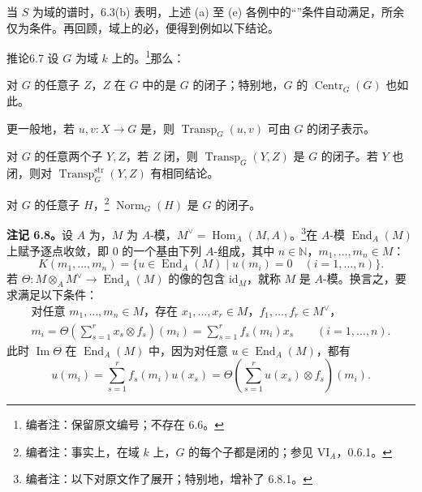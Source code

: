 当 $S$ 为域的谱时，6.3(b) 表明，上述 (a) 至 (e) 各例中的“”条件自动满足，所余仅为条件。再回顾，域上的必，便得到例如以下结论。
\begin{SGAresult}{推论}{6.7}
设 $G$ 为域 $k$ 上的。\footnote[29]{编者注：保留原文编号；不存在 6.6。}那么：

对 $G$ 的任意子 $Z$，$Z$ 在 $G$ 中的是 $G$ 的闭子；特别地，$G$ 的 $\operatorname{Centr}_G(G)$ 也如此。

更一般地，若 $u,v:X\to G$ 是，则 $\operatorname{Transp}_G(u,v)$ 可由 $G$ 的闭子表示。

对 $G$ 的任意两个子 $Y,Z$，若 $Z$ 闭，则 $\operatorname{Transp}_G(Y,Z)$ 是 $G$ 的闭子。若 $Y$ 也闭，则对 $\operatorname{Transp}^{\mathrm{str}}_G(Y,Z)$ 有相同结论。

对 $G$ 的任意子 $H$，\footnote[30]{编者注：事实上，在域 $k$ 上，$G$ 的每个子都是闭的；参见 VI$_A$，0.6.1。} $\operatorname{Norm}_G(H)$ 是 $G$ 的闭子。
\end{SGAresult}
\textbf{注记 6.8。}设 $A$ 为，$M$ 为 $A$-模，$M^\vee=\operatorname{Hom}_A(M,A)$。\footnote[31]{编者注：以下对原文作了展开；特别地，增补了 6.8.1。}在 $A$-模 $\operatorname{End}_A(M)$ 上赋予逐点收敛，即 $0$ 的一个基由下列 $A$-组成，其中 $n\in\mathbb N$，$m_1,\ldots,m_n\in M$：
\[
K(m_1,\ldots,m_n)=\{u\in\operatorname{End}_A(M)\mid u(m_i)=0\quad(i=1,\ldots,n)\}.
\]
若 $\Theta:M\otimes_AM^\vee\to\operatorname{End}_A(M)$ 的像的包含 $\mathrm{id}_M$，就称 $M$ 是 $A$-模。换言之，要求满足以下条件：
\[
\begin{gathered}
\text{对任意 }m_1,\ldots,m_n\in M，\text{存在 }x_1,\ldots,x_r\in M，f_1,\ldots,f_r\in M^\vee，\\
 m_i=\Theta\!\left(\sum_{s=1}^r x_s\otimes f_s\right)(m_i)
 =\sum_{s=1}^r f_s(m_i)x_s\qquad(i=1,\ldots,n).
\end{gathered}\tag{*}
\]
此时 $\operatorname{Im}\Theta$ 在 $\operatorname{End}_A(M)$ 中，因为对任意 $u\in\operatorname{End}_A(M)$，都有
\[
u(m_i)=\sum_{s=1}^r f_s(m_i)u(x_s)
=\Theta\!\left(\sum_{s=1}^r u(x_s)\otimes f_s\right)(m_i).
\]

